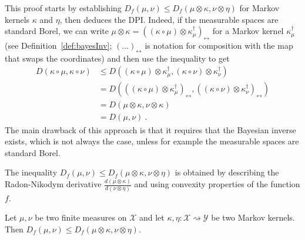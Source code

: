 This proof starts by establishing $D_f(\mu, \nu) \le D_f(\mu \otimes \kappa, \nu \otimes \eta)$ for Markov kernels $\kappa$ and $\eta$, then deduces the DPI.
Indeed, if the measurable spaces are standard Borel, we can write $\mu \otimes \kappa = ((\kappa \circ \mu) \otimes \kappa^\dagger_\mu)_\leftrightarrow$ for a Markov kernel $\kappa^\dagger_\mu$ (see Definition~\ref{def:bayesInv}; $(...)_\leftrightarrow$ is notation for composition with the map that swaps the coordinates) and then use the inequality to get
\begin{align*}
D(\kappa \circ \mu, \kappa \circ \nu)
&\le D((\kappa \circ \mu) \otimes \kappa^\dagger_\mu, (\kappa \circ \nu) \otimes \kappa^\dagger_\nu)
\\
&= D(((\kappa \circ \mu) \otimes \kappa^\dagger_\mu)_{\leftrightarrow}, ((\kappa \circ \nu) \otimes \kappa^\dagger_\nu)_{\leftrightarrow})
\\
&= D(\mu \otimes \kappa, \nu \otimes \kappa)
\\
&= D(\mu, \nu)
\: .
\end{align*}
The main drawback of this approach is that it requires that the Bayesian inverse exists, which is not always the case, unless for example the measurable spaces are standard Borel.

The inequality $D_f(\mu, \nu) \le D_f(\mu \otimes \kappa, \nu \otimes \eta)$ is obtained by describing the Radon-Nikodym derivative $\frac{d(\mu \otimes \kappa)}{d(\nu \otimes \eta)}$ and using convexity properties of the function $f$.

\begin{theorem}
  \label{thm:fDiv_le_compProd_1}
  \leanok
  Let $\mu, \nu$ be two finite measures on $\mathcal X$ and let $\kappa, \eta : \mathcal X \rightsquigarrow \mathcal Y$ be two Markov kernels.
  Then $D_f(\mu, \nu) \le D_f(\mu \otimes \kappa, \nu \otimes \eta)$.
\end{theorem}


